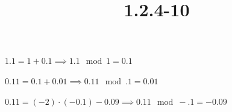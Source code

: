 \documentclass{article}
\title{1.2.4-10}
\begin{document}
\maketitle

$1.1 = 1 + 0.1 \implies 1.1 \mod 1 = 0.1$

$0.11 = 0.1 + 0.01 \implies 0.11 \mod .1 = 0.01$

$0.11 = (-2)\cdot (-0.1) - 0.09 \implies 0.11 \mod -.1 = -0.09$
\end{document}
